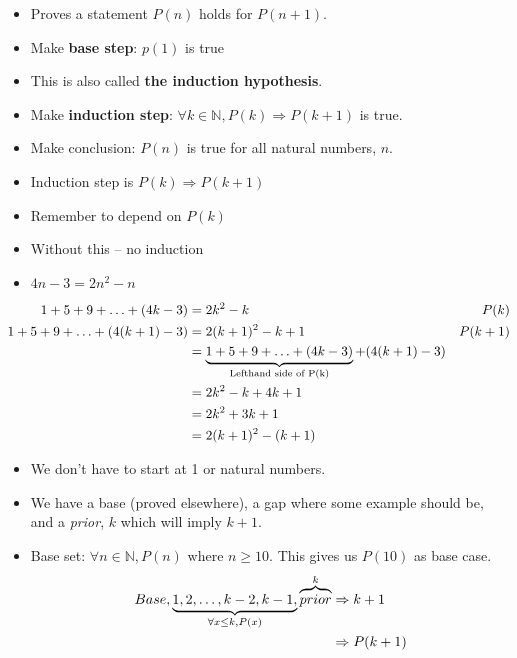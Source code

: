 \documentclass[english,10pt,a4paper]{article}
\begin{document}
\begin{theo}[Basic] 
\begin{itemize}
\item Proves a statement $P(n)$ holds for $P(n+1)$.
\item Make \textbf{base step}: $p(1)$ is true
\item[] This is also called \textbf{the induction hypothesis}.
\item Make \textbf{induction step}: $\forall k \in \mathbb{N}, P(k) \Rightarrow P(k+1)$ is true.
\item Make conclusion: $P(n)$ is true for all natural numbers, $n$.
\end{itemize}
\end{theo}


\begin{theo} 
\begin{itemize}
\item Induction step is $P(k) \Rightarrow P(k+1)$
\item Remember to depend on $P(k)$
\item Without this -- no induction
\item $4n-3 = 2n^2-n$
\end{itemize}
\begin{align}
1+5+9+\ldots+(4k-3) &= 2k^2-k & P(k)\\
1+5+9+\ldots+(4(k+1)-3) &= 2(k+1)^2-k+1 & P(k+1) \label{equ:2-2}\\
	&= \underbrace{1+5+9+\ldots+(4k-3)}_{\mathclap{\text{Lefthand side of P(k)}}}+(4(k+1)-3)\\
	&=2k^2-k+4k+1\\
	&=2k^2+3k+1\\
	&=2(k+1)^2-(k+1) 
\end{align}
\end{theo}



\begin{theo} 
\begin{itemize}
\item We don't have to start at 1 or natural numbers.
\item We have a base (proved elsewhere), a gap where some example should be, and a \textit{prior}, $k$ which will imply $k+1$.
\item Base set: $\forall n \in \mathbb{N}, P(n) \text{ where } n \geq 10$. This gives us $P(10)$ as base case.
\begin{align*}
Base, \underbrace{1,2, \ldots, k-2,k-1,}_{\mathclap{\forall x \leq k, P(x)}} \overbrace{prior}^k &\Rightarrow k+1\\
	&\Rightarrow P(k+1)
\end{align*} 
\end{itemize}
\end{theo}
\end{document}
